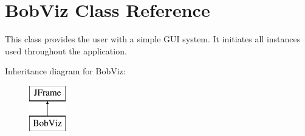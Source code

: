 \hypertarget{class_bob_viz}{\section{Bob\-Viz Class Reference}
\label{class_bob_viz}
}


This class provides the user with a simple G\-U\-I system. It initiates all instances used throughout the application.  


Inheritance diagram for Bob\-Viz\-:\begin{figure}[H]
\begin{center}
\leavevmode
\includegraphics[height=2.000000cm]{class_bob_viz}
\end{center}
\end{figure}

